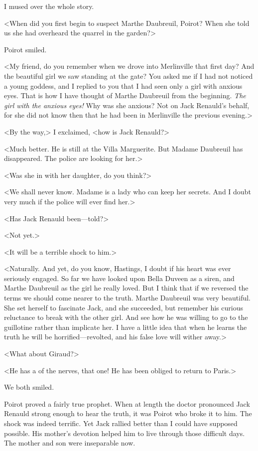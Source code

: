  I mused over the whole story. 

 <When did you first begin to suspect Marthe Daubreuil, Poirot? When she told us she had overheard the quarrel in the garden?> 

 Poirot smiled. 

 <My friend, do you remember when we drove into Merlinville that first day? And the beautiful girl we saw standing at the gate? You asked me if I had not noticed a young goddess, and I replied to you that I had seen only a girl with anxious eyes. That is how I have thought of Marthe Daubreuil from the beginning. \emph{The girl with the anxious eyes!} Why was she anxious? Not on Jack Renauld's behalf, for she did not know then that he had been in Merlinville the previous evening.> 

 <By the way,> I exclaimed, <how is Jack Renauld?> 

 <Much better. He is still at the Villa Marguerite. But Madame Daubreuil has disappeared. The police are looking for her.> 

 <Was she in with her daughter, do you think?> 

 <We shall never know. Madame is a lady who can keep her secrets. And I doubt very much if the police will ever find her.> 

 <Has Jack Renauld been—told?> 

 <Not yet.> 

 <It will be a terrible shock to him.> 

 <Naturally. And yet, do you know, Hastings, I doubt if his heart was ever seriously engaged. So far we have looked upon Bella Duveen as a siren, and Marthe Daubreuil as the girl he really loved. But I think that if we reversed the terms we should come nearer to the truth. Marthe Daubreuil was very beautiful. She set herself to fascinate Jack, and she succeeded, but remember his curious reluctance to break with the other girl. And see how he was willing to go to the guillotine rather than implicate her. I have a little idea that when he learns the truth he will be horrified—revolted, and his false love will wither away.> 

 <What about Giraud?> 

 <He has a  of the nerves, that one! He has been obliged to return to Paris.> 

 We both smiled. 

 Poirot proved a fairly true prophet. When at length the doctor pronounced Jack Renauld strong enough to hear the truth, it was Poirot who broke it to him. The shock was indeed terrific. Yet Jack rallied better than I could have supposed possible. His mother's devotion helped him to live through those difficult days. The mother and son were inseparable now. 

